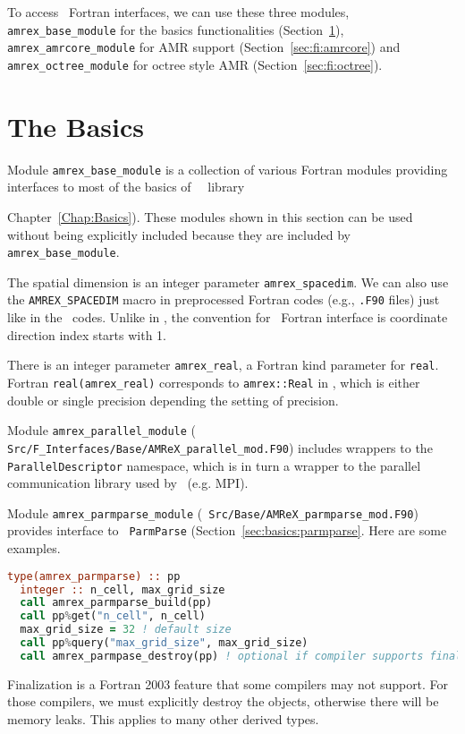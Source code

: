 To access \amrex\ Fortran interfaces, we can use these three
modules, {\tt amrex\_base\_module} for the basics functionalities
(Section~\ref{sec:fi:basics}), {\tt amrex\_amrcore\_module} for AMR
support (Section~\ref{sec:fi:amrcore}) and {\tt amrex\_octree\_module}
for octree style AMR (Section~\ref{sec:fi:octree}).

\section{The Basics}
\label{sec:fi:basics}

Module {\tt amrex\_base\_module} is a collection of various Fortran
modules providing interfaces to most of the basics of \amrex\ \cpp\
library {Chapter~\ref{Chap:Basics}).  These modules shown in this
section can be used without being explicitly included because they are
included by {\tt amrex\_base\_module}.

The spatial dimension is an integer parameter {\tt amrex\_spacedim}.
We can also use the {\tt AMREX\_SPACEDIM} macro in preprocessed
Fortran codes (e.g., {\tt .F90} files) just like in the \cpp\
codes.  Unlike in \cpp, the convention for \amrex\ Fortran interface
is coordinate direction index starts with 1.

There is an integer parameter {\tt amrex\_real}, a Fortran
kind parameter for {\tt real}.  Fortran {\tt real(amrex\_real)}
corresponds to {\tt amrex::Real} in \cpp, which is either double or
single precision depending the setting of precision.

Module {\tt amrex\_parallel\_module} ({\tt
  Src/F\_Interfaces/Base/AMReX\_parallel\_mod.F90}) includes wrappers
to the {\tt ParallelDescriptor} namespace, which is in turn a wrapper
to the parallel communication library used by \amrex\ (e.g. MPI).

Module {\tt amrex\_parmparse\_module} ({\tt
  Src/Base/AMReX\_parmparse\_mod.F90}) provides interface to {\tt
  ParmParse} (Section~\ref{sec:basics:parmparse}.  Here are some
examples.
\begin{lstlisting}[language=fortran]
  type(amrex_parmparse) :: pp
  integer :: n_cell, max_grid_size
  call amrex_parmparse_build(pp)
  call pp%get("n_cell", n_cell)
  max_grid_size = 32 ! default size
  call pp%query("max_grid_size", max_grid_size)
  call amrex_parmpase_destroy(pp) ! optional if compiler supports finalization
\end{lstlisting}
Finalization is a Fortran 2003 feature that some compilers may not
support.  For those compilers, we must explicitly destroy the objects,
otherwise there will be memory leaks.  This applies to many other
derived types.

}
